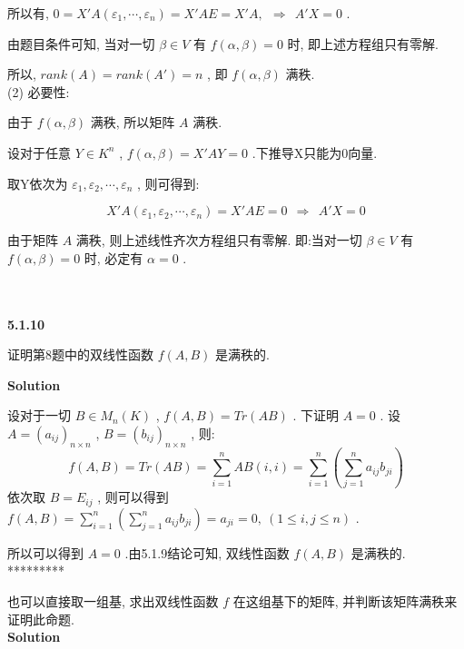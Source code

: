 \documentclass[11pt,a4paper,openany,oneside]{book}
\newcommand\Solution{\noindent\textbf{\textsf{Solution}}\par\medskip}
\begin{document}
所以有,  $ 0 = X'A(\varepsilon_1, \cdots, \varepsilon_n) = X'AE = X'A, \ \ \Rightarrow \ \ A'X = 0  $ .

由题目条件可知, 当对一切 $ \beta \in V $ 有 $ f(\alpha, \beta) = 0 $ 时, 即上述方程组只有零解. 

所以,  $ rank(A) = rank(A') = n $ , 即 $ f(\alpha, \beta) $ 满秩. \\

(2) 必要性:

由于 $ f(\alpha, \beta) $ 满秩, 所以矩阵 $ A $ 满秩. 

设对于任意 $ Y \in K^n $ ,  $ f(\alpha, \beta) = X'AY = 0 $ .下推导X只能为0向量.

取Y依次为 $ \varepsilon_1, \varepsilon_2, \cdots, \varepsilon_n $ , 则可得到:

 $$  X'A(\varepsilon_1, \varepsilon_2, \cdots, \varepsilon_n) = X'AE = 0 \ \ \Rightarrow \ \ A'X =0   $$ 

由于矩阵 $ A $ 满秩, 则上述线性齐次方程组只有零解. 即:当对一切 $ \beta \in V $ 有 $ f(\alpha, \beta) = 0 $ 时, 必定有 $ \alpha = 0 $ . \\  \\  \\






\begin{myexample}
	\textbf{5.1.10}

证明第8题中的双线性函数 $ f(A,B) $ 是满秩的. \\  

\end{myexample}
\Solution  

设对于一切 $ B \in M_n(K) $ ,  $ f(A, B) = Tr(AB) $ . 下证明 $ A=0 $ . 设 $ A = (a_{ij})_{n \times n} $ ,  $ B = (b_{ij})_{n \times n} $ , 则:
 $$  f(A,B) = Tr(AB) = \sum\limits_{i=1}^n AB(i,i) = \sum\limits_{i=1}^n(\sum\limits_{j=1}^n a_{ij}b_{ji})  $$ 
依次取 $ B = E_{ij} $ , 则可以得到 $ f(A, B) = \sum\limits_{i=1}^n(\sum\limits_{j=1}^n a_{ij}b_{ji}) = a_{ji} = 0, \ (1 \leq i, j \leq n) $ .

所以可以得到 $ A = 0 $ .由5.1.9结论可知, 双线性函数 $ f(A,B) $ 是满秩的.  \\  

*********

也可以直接取一组基, 求出双线性函数 $ f $ 在这组基下的矩阵, 并判断该矩阵满秩来证明此命题. \\


\Solution
\end{document}
